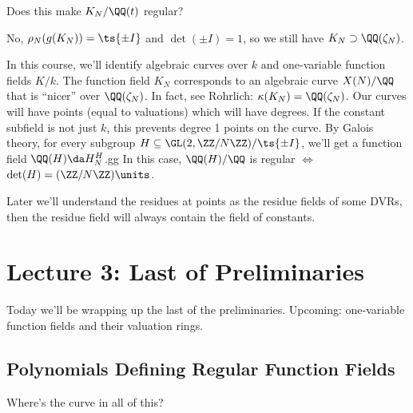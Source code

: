 \begin{question}

Does this make \(K_N/\QQ(t)\) regular?

\end{question}

\begin{answer}

No, \(\rho_N(g(K_N)) = \ts{\pm I}\) and \(\det(\pm I) = 1\), so we still
have \(K_N \supset \QQ(\zeta_N)\).

\end{answer}

In this course, we'll identify algebraic curves over \(k\) and
one-variable function fields \(K/k\). The function field \(K_N\)
corresponds to an algebraic curve \(X(N)/\QQ\) that is ``nicer'' over
\(\QQ(\zeta_N)\). In fact, see Rohrlich: \(\kappa(K_N) = \QQ(\zeta_N)\).
Our curves will have points (equal to valuations) which will have
degrees. If the constant subfield is not just \(k\), this prevents
degree 1 points on the curve. By Galois theory, for every subgroup
\(H \subseteq \GL(2, \ZZ/N\ZZ) / \ts{\pm I}\), we'll get a function
field \(\QQ(H) \da H_N^H\).gg In this case, \(\QQ(H)/\QQ\) is regular
\(\iff\) \(\det(H) = (\ZZ/N\ZZ)\units\).

Later we'll understand the residues at points as the residue fields of
some DVRs, then the residue field will always contain the field of
constants.

\hypertarget{lecture-3-last-of-preliminaries}{%
\section{Lecture 3: Last of
Preliminaries}\label{lecture-3-last-of-preliminaries}}

Today we'll be wrapping up the last of the preliminaries. Upcoming:
one-variable function fields and their valuation rings.

\hypertarget{polynomials-defining-regular-function-fields}{%
\subsection{Polynomials Defining Regular Function
Fields}\label{polynomials-defining-regular-function-fields}}

\begin{question}

Where's the curve in all of this?

\end{question}

